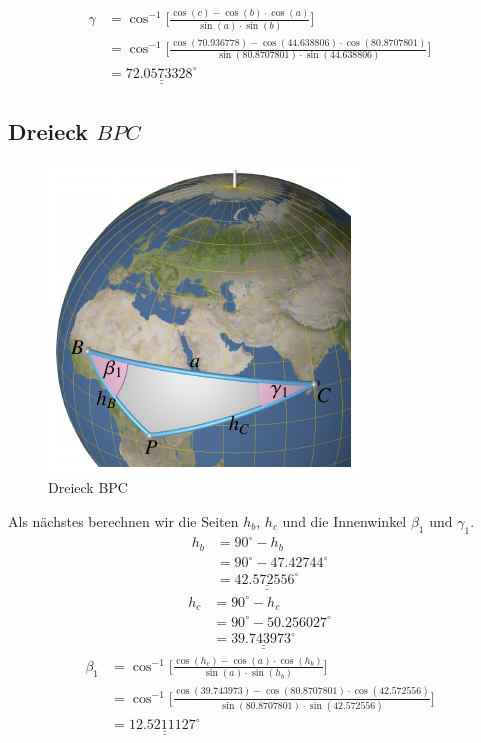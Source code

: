 	\begin{align}
	\gamma &=  \cos^{-1}  \bigg[\frac{\cos(c)-\cos(b) \cdot \cos(a)}{\sin(a) \cdot \sin(b)}\bigg] \nonumber \\
	&=  \cos^{-1}  \bigg[\frac{\cos(70.936778)-\cos(44.638806) \cdot \cos(80.8707801)}{\sin(80.8707801) \cdot \sin(44.638806)}\bigg] \nonumber \\
	&=\underline{\underline{72.0573328^\circ}} \nonumber
\end{align}
\subsection{Dreieck $BPC$}
\begin{figure}
	\includegraphics{papers/nav/bilder/position3.pdf}
	\caption{Dreieck BPC}
\end{figure}
Als nächstes berechnen wir die Seiten $h_b$, $h_c$ und die Innenwinkel $\beta_1$ und $\gamma_1$.
\begin{align}
	h_b&=90^\circ - h_b \nonumber \\
	&= 90^\circ - 47.42744^\circ \nonumber \\
	&= \underline{\underline{42.572556^\circ}} \nonumber
\end{align}
\begin{align}
	h_c &= 90^\circ - h_c \nonumber \\
	&= 90^\circ - 50.256027^\circ \nonumber \\
	&= \underline{\underline{39.743973^\circ}} \nonumber
\end{align}
\begin{align}
	\beta_1 &= \cos^{-1}  \bigg[\frac{\cos(h_c)-\cos(a) \cdot \cos(h_b)}{\sin(a) \cdot \sin(h_b)}\bigg] \nonumber \\
	&= \cos^{-1}  \bigg[\frac{\cos(39.743973)-\cos(80.8707801) \cdot \cos(42.572556)}{\sin(80.8707801) \cdot \sin(42.572556)}\bigg] \nonumber \\
	&=\underline{\underline{12.5211127^\circ}} \nonumber
\end{align}
